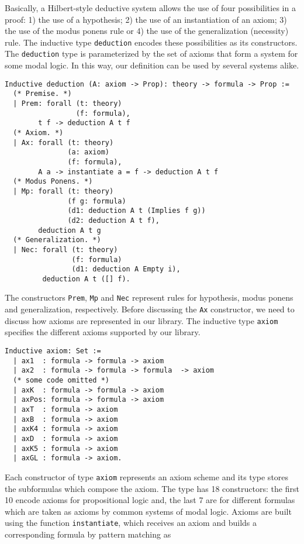 \documentclass[3p,times]{elsarticle}
\begin{document}
Basically, a Hilbert-style deductive system allows the use of four
possibilities in a proof: 1) the use of a hypothesis; 2) the use of an instantiation of an axiom;
3) the use of the modus ponens rule or 4) the use of the generalization (necessity)
rule. The inductive type \texttt{deduction} encodes these possibilities
as its constructors. The \texttt{deduction} type is parameterized by
the set of axioms that form a system for some modal logic. In this way, our definition can be
used by several systems alike.
\begin{verbatim}
Inductive deduction (A: axiom -> Prop): theory -> formula -> Prop :=
  (* Premise. *)
  | Prem: forall (t: theory)
                 (f: formula),
        t f -> deduction A t f
  (* Axiom. *)
  | Ax: forall (t: theory)
               (a: axiom)
               (f: formula),
        A a -> instantiate a = f -> deduction A t f
  (* Modus Ponens. *)
  | Mp: forall (t: theory)
               (f g: formula)
               (d1: deduction A t (Implies f g))
               (d2: deduction A t f),
        deduction A t g
  (* Generalization. *)
  | Nec: forall (t: theory)
                (f: formula)
                (d1: deduction A Empty i),
         deduction A t ([] f).
\end{verbatim}
The constructors \texttt{Prem}, \texttt{Mp} and \texttt{Nec}
represent rules for hypothesis, modus ponens and generalization, respectively.
Before discussing the \texttt{Ax} constructor, we need to discuss how axioms are
represented in our library. The inductive type \texttt{axiom} specifies
the different axioms supported by our library.
\begin{verbatim}
Inductive axiom: Set :=
  | ax1  : formula -> formula -> axiom
  | ax2  : formula -> formula -> formula  -> axiom
  (* some code omitted *)
  | axK  : formula -> formula -> axiom
  | axPos: formula -> formula -> axiom
  | axT  : formula -> axiom
  | axB  : formula -> axiom
  | axK4 : formula -> axiom
  | axD  : formula -> axiom
  | axK5 : formula -> axiom
  | axGL : formula -> axiom.
\end{verbatim}
Each constructor of type \texttt{axiom} represents an axiom scheme and
its type stores the subformulas which compose the axiom. The type has
18 constructors: the first 10 encode axioms for propositional logic
and, the last 7 are for different formulas which are taken as axioms by common
systems of modal logic. Axioms are built using the function \texttt{instantiate},
which receives an axiom and builds a corresponding formula by pattern matching as
\end{document}
